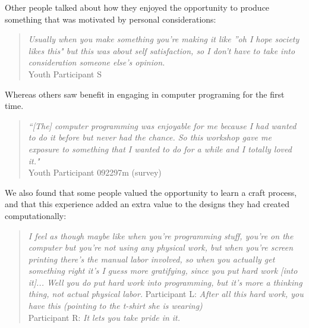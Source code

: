 \documentclass{sigchi}
\begin{document}
Other people talked about how they enjoyed the opportunity to produce something that was motivated by personal considerations:
\begin{quotation}
\textit{Usually when you make something you're making it like ''oh I hope society likes this" but this was about self satisfaction, so I don't have to take into consideration someone else's opinion.}
\\Youth Participant S
\end{quotation}

Whereas others saw benefit in engaging in computer programing for the first time.
\begin{quotation}
\textit{``[The] computer programming was enjoyable for me because I had wanted to do it before but never had the chance. So this workshop gave me exposure to something that I wanted to do for a while and I totally loved it."}
\\Youth Participant 092297m (survey)
\end{quotation}

We also found that some people valued the opportunity to learn a craft process, and that this experience added an extra value to the designs they had created computationally:
\begin{quotation}
\textit{I feel as though maybe like when you're programming stuff, you're on the computer but you're not using any physical work, but when you're screen printing there's the manual labor involved, so when you actually get something right it's I guess more gratifying, since you put hard work [into it]... Well you do put hard work into programming, but it's more a thinking thing, not actual physical labor.}
Participant L: \textit{After all this hard work, you have this (pointing to the t-shirt she is wearing)}
\\Participant R: \textit{It lets you take pride in it.}
\end{quotation}
\end{document}
